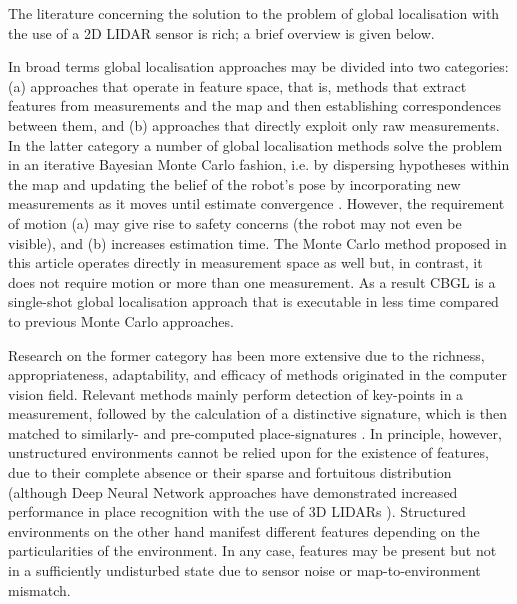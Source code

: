 The literature concerning the solution to the problem of global localisation
with the use of a 2D LIDAR sensor is rich; a brief overview is given below.

In broad terms global localisation approaches may be divided into two
categories: (a) approaches that operate in feature space, that is, methods that
extract features from measurements and the map and then establishing
correspondences between them, and (b) approaches that directly exploit only raw
measurements. In the latter category a number of global localisation methods
solve the problem in an iterative Bayesian Monte Carlo fashion, i.e. by
dispersing hypotheses within the map and updating the belief of the robot's
pose by incorporating new measurements as it moves until estimate convergence
\cite{mcl,Wang2018d,Yilmaz2019a,gmcl,Chen2021a}. However, the requirement of
motion (a) may give rise to safety concerns (the robot may not even be
visible), and (b) increases estimation time. The Monte Carlo method proposed in
this article operates directly in measurement space as well but, in contrast,
it does not require motion or more than one measurement. As a result CBGL is a
single-shot global localisation approach that is executable in less time
compared to previous Monte Carlo approaches.

Research on the former category has been more extensive due to the richness,
appropriateness, adaptability, and efficacy of methods originated in the
computer vision field. Relevant methods mainly perform detection of key-points
in a measurement, followed by the calculation of a distinctive signature,
which is then matched to similarly- and pre-computed place-signatures
\cite{Kallasi2016a,Usman2019,Wang2021b,Meng2021,Hendrikx2021,An2022,Nielsen2023}.
In principle, however, unstructured environments cannot be relied upon for the
existence of features, due to their complete absence or their sparse and
fortuitous distribution (although Deep Neural Network approaches have
demonstrated increased performance in place recognition with the use of 3D
LIDARs \cite{Xu2021,Yin2022,Komorowski2022}). Structured environments on the
other hand manifest different features depending on the particularities of the
environment. In any case, features may be present but not in a sufficiently
undisturbed state due to sensor noise or map-to-environment mismatch.


